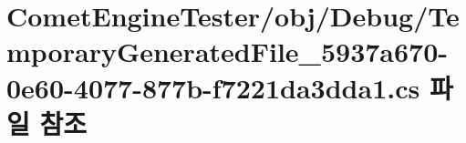 \hypertarget{_comet_engine_tester_2obj_2_debug_2_temporary_generated_file__5937a670-0e60-4077-877b-f7221da3dda1_8cs}{}\section{Comet\+Engine\+Tester/obj/\+Debug/\+Temporary\+Generated\+File\+\_\+5937a670-\/0e60-\/4077-\/877b-\/f7221da3dda1.cs 파일 참조}
\label{_comet_engine_tester_2obj_2_debug_2_temporary_generated_file__5937a670-0e60-4077-877b-f7221da3dda1_8cs}
